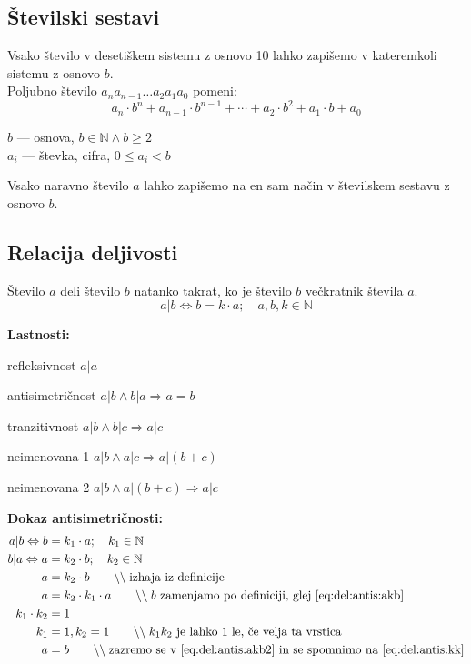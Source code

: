 \documentclass[a4paper,oneside,12pt,fleqn]{article}
\def\N{\ensuremath{\mathbb N}}
\newcommand\krat\cdot
\newcommand{\comment}[1]{\ensuremath{\qquad\backslash\backslash\;}\textnormal{#1}}
\renewcommand\implies\Rightarrow
\renewcommand\iff\Leftrightarrow
\numberwithin{equation}{section}
\newenvironment{xlist}[1][\rule{0.75 cm}{0cm}]{%
\vspace{-14pt}
  \begin{list}{}{%
    \settowidth{\labelwidth}{#1:}
    \setlength{\labelsep}{0.5cm}
    \setlength{\leftmargin}{\labelwidth}
    \addtolength{\leftmargin}{\labelsep}
    \addtolength{\leftmargin}{20pt}
    \setlength{\rightmargin}{0pt}
    \setlength{\parsep}{0.5ex plus 0.2ex minus 0.1ex}
    \setlength{\itemsep}{0 ex plus 0.2ex}
    \renewcommand{\makelabel}[1]{##1:\hfil}
    }
  }
{\end{list}}
\begin{document}
\subsection{Številski sestavi}
Vsako število v desetiškem sistemu z osnovo 10 lahko zapišemo v kateremkoli sistemu
z osnovo $b$. \\
Poljubno število $a_na_{n-1}\!\ldots a_2a_1a_0$ pomeni:
\[ a_n \krat b^n + a_{n-1} \krat b^{n-1} + \cdots + a_2 \krat b^2 +a_1 \krat b + a_0 \]

$b$ --- osnova, $b \in \N \land b \geq 2$ \\
$a_i$ --- števka, cifra, $0 \leq a_i < b$

Vsako naravno število $a$ lahko zapišemo na en sam način v številskem sestavu z osnovo $b$.

\subsection{Relacija deljivosti}
Število $a$ deli število $b$ natanko takrat, ko je število $b$ večkratnik števila $a$.
\[ a | b \iff b = k \krat a;\quad a, b, k \in \N \]

\textbf{Lastnosti:}
\begin{xlist}[Antisimetričnost]
  \item[refleksivnost]       $a|a$
  \item[antisimetričnost]  $a|b \land b|a \implies a = b$
  \item[tranzitivnost]      $a|b \land b|c \implies a|c$
  \item[neimenovana 1]      $a|b \land a|c \implies a|\left( b+c \right)$
  \item[neimenovana 2]      $a|b \land a|\left( b+c \right) \implies a|c$
\end{xlist}

\textbf{Dokaz antisimetričnosti:}
\begin{align}
  a|b \iff b &= k_1 \krat a; \quad k_1 \in \N \\
  b|a \iff a &= k_2 \krat b; \quad k_2 \in \N \label{eq:del:antis:akb} \\
  a &= k_2 \krat b \comment{izhaja iz definicije} \label{eq:del:antis:akb2} \\
  a &= k_2 \krat k_1 \krat a \comment{$b$ zamenjamo po definiciji, glej \eqref{eq:del:antis:akb}} \\
  k_1 \krat k_2 &= 1 \\
  k_1 &= 1, k_2 = 1 \label{eq:del:antis:kk} \comment{$k_1k_2$ je lahko 1 le, če velja ta
  vrstica} \\
  a &= b \comment{zazremo se v \eqref{eq:del:antis:akb2} in se spomnimo na \eqref{eq:del:antis:kk}}
\end{align}
\end{document}
